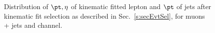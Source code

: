 \begin{figure}
    \caption{Distribution of $\pt, \eta$ of kinematic fitted lepton and $\pt$ of jets
    after kinematic fit selection as described in Sec.~\ref{s:secEvtSel}, 
for muons + jets and \ejets channel.}
    \label{fig:kfitPlot1}
\end{figure}

